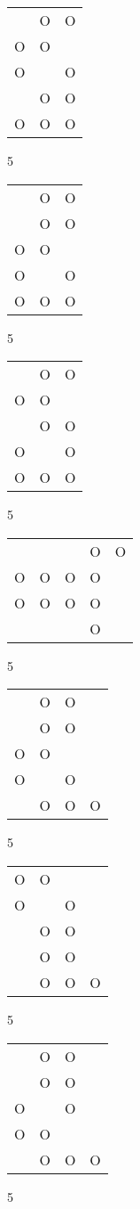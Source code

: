 \begin{tabular}{|m{0.2cm}m{0.2cm}m{0.2cm}|}\hline
 &O&O\\
O&O& \\
O& &O\\
 &O&O\\
O&O&O\\
\hline\end{tabular}5
\begin{tabular}{|m{0.2cm}m{0.2cm}m{0.2cm}|}\hline
 &O&O\\
 &O&O\\
O&O& \\
O& &O\\
O&O&O\\
\hline\end{tabular}5
\begin{tabular}{|m{0.2cm}m{0.2cm}m{0.2cm}|}\hline
 &O&O\\
O&O& \\
 &O&O\\
O& &O\\
O&O&O\\
\hline\end{tabular}5
\begin{tabular}{|m{0.2cm}m{0.2cm}m{0.2cm}m{0.2cm}m{0.2cm}|}\hline
 & & &O&O\\
O&O&O&O& \\
O&O&O&O& \\
 & & &O& \\
\hline\end{tabular}5
\begin{tabular}{|m{0.2cm}m{0.2cm}m{0.2cm}m{0.2cm}|}\hline
 &O&O& \\
 &O&O& \\
O&O& & \\
O& &O& \\
 &O&O&O\\
\hline\end{tabular}5
\begin{tabular}{|m{0.2cm}m{0.2cm}m{0.2cm}m{0.2cm}|}\hline
O&O& & \\
O& &O& \\
 &O&O& \\
 &O&O& \\
 &O&O&O\\
\hline\end{tabular}5
\begin{tabular}{|m{0.2cm}m{0.2cm}m{0.2cm}m{0.2cm}|}\hline
 &O&O& \\
 &O&O& \\
O& &O& \\
O&O& & \\
 &O&O&O\\
\hline\end{tabular}5
